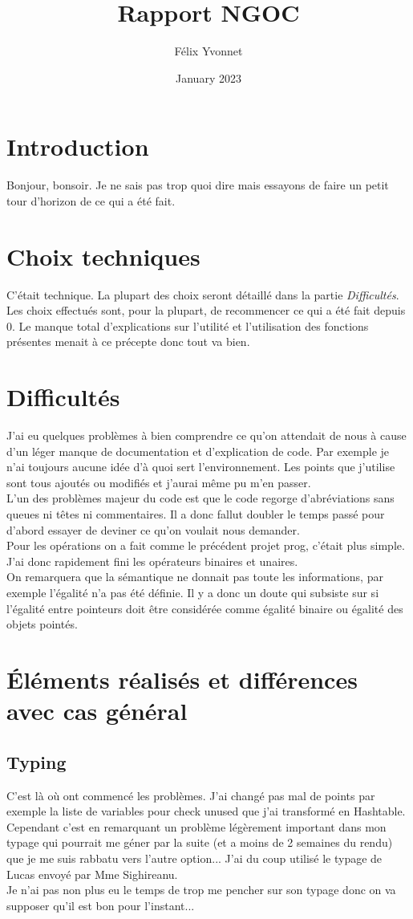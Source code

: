 \documentclass{article}
\title{Rapport NGOC}
\author{Félix Yvonnet}
\date{January 2023}
\begin{document}
\maketitle

\section{Introduction}
Bonjour, bonsoir. Je ne sais pas trop quoi dire mais essayons de faire un petit tour d'horizon de ce qui a été fait.

\section{Choix techniques}
C'était technique. La plupart des choix seront détaillé dans la partie \textit{Difficultés}. Les choix effectués sont, pour la plupart, de recommencer ce qui a été fait depuis 0. Le manque total d'explications sur l'utilité et l'utilisation des fonctions présentes menait à ce précepte donc tout va bien.
\section{Difficultés}
J'ai eu quelques problèmes à bien comprendre ce qu'on attendait de nous à cause d'un léger manque de documentation et d'explication de code. Par exemple je n'ai toujours aucune idée d'à quoi sert l'environnement. Les points que j'utilise sont tous ajoutés ou modifiés et j'aurai même pu m'en passer.\\
L'un des problèmes majeur du code est que le code regorge d'abréviations sans queues ni têtes ni commentaires. Il a donc fallut doubler le temps passé pour d'abord essayer de deviner ce qu'on voulait nous demander.\\

Pour les opérations on a fait comme le précédent projet prog, c'était plus simple. J'ai donc rapidement fini les opérateurs binaires et unaires.\\
On remarquera que la sémantique ne donnait pas toute les informations, par exemple l'égalité n'a pas été définie. Il y a donc un doute qui subsiste sur si l'égalité entre pointeurs doit être considérée comme égalité binaire ou égalité des objets pointés.

\section{\'Eléments réalisés et différences avec cas général}
\subsection{Typing}
C'est là où ont commencé les problèmes. J'ai changé pas mal de points par exemple la liste de variables pour check unused que j'ai transformé en Hashtable. Cependant c'est en remarquant un problème légèrement important dans mon typage qui pourrait me géner par la suite (et a moins de 2 semaines du rendu) que je me suis rabbatu vers l'autre option... J'ai du coup utilisé le typage de Lucas envoyé par Mme Sighireanu.\\
Je n'ai pas non plus eu le temps de trop me pencher sur son typage donc on va supposer qu'il est bon pour l'instant...
\end{document}
